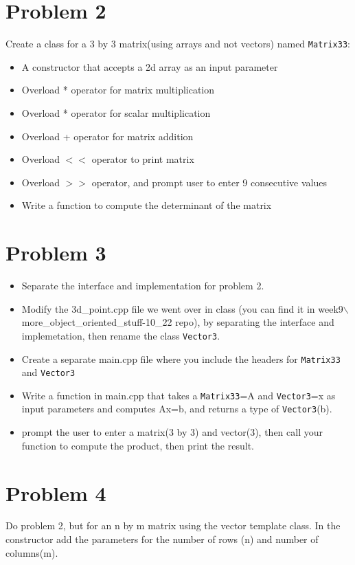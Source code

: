 \documentclass[a4paper]{article}
\begin{document}
\section*{Problem 2}
Create a class for a 3 by 3 matrix(using arrays and not vectors) named \texttt{Matrix33}:
\begin{itemize}
    \item A constructor that accepts a 2d array as an input parameter 
    \item Overload * operator for matrix multiplication
    \item Overload * operator for scalar multiplication
    \item Overload + operator for matrix addition
    \item Overload $<<$ operator to print matrix
    \item Overload $>>$ operator, and prompt user to enter 9 consecutive values
    \item Write a function to compute the determinant of the matrix 
\end{itemize}
\newpage

\section*{Problem 3}
\begin{itemize}
    \item Separate the interface and implementation for problem 2.
    \item Modify the 3d\_point.cpp file we went over in class
    (you can find it in week9$\backslash$more\_object\_oriented\_stuff-10\_22 repo), 
    by separating the interface and implemetation, then rename the class \texttt{Vector3}.
    \item Create a separate main.cpp file where you include the headers for \texttt{Matrix33} and \texttt{Vector3}
    \item Write a function in main.cpp that takes a  \texttt{Matrix33}=A and \texttt{Vector3}=x as input parameters
          and computes Ax=b, and returns a type of \texttt{Vector3}(b). 
    \item prompt the user to enter a matrix(3 by 3) and vector(3), then call your function to compute the product, then print the result.
\end{itemize}
\newpage
 

\section*{Problem 4}
Do problem 2, but for an n by m matrix using the vector template class. 
In the constructor add the parameters for the number of rows (n) and number of columns(m).
\end{document}
